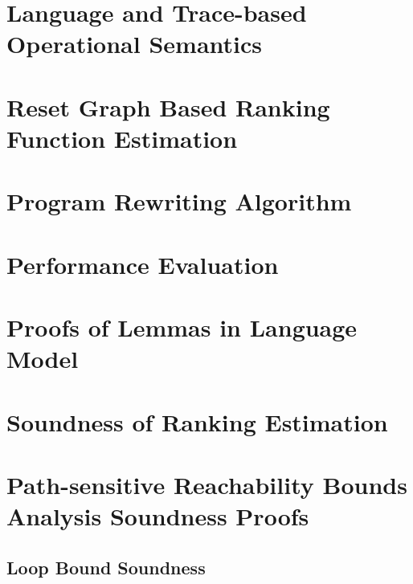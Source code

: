 \section{Language and Trace-based Operational Semantics}
\label{apdx:language}

\clearpage

\section{Reset Graph Based Ranking Function Estimation}
\label{apdx:alg-resetgraph}

\clearpage

\section{Program Rewriting Algorithm}
\label{apdx:alg-rewrite}

\clearpage


\section{Performance Evaluation}
\label{apdx:eval-performance}

\clearpage

\section{Proofs of Lemmas in Language Model}
\label{apdx:lem_language}

\clearpage
% 
\section{Soundness of Ranking Estimation}
\label{apdx:pathinsensitive_rb_soundness}

\clearpage

\section{Path-sensitive Reachability Bounds Analysis Soundness Proofs}
\label{apdx:pathsensitive_rb_soundness}

\subsection{Loop Bound Soundness}
\label{apdx:loopbound-sound}

\clearpage

